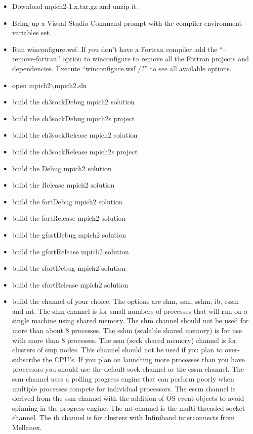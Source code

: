 \documentclass[dvipdfm,11pt]{article}
\begin{document}
\begin{itemize}
\item
Download mpich2-1.x.tar.gz and unzip it.
\item
Bring up a Visual Studio Command prompt with the compiler environment 
variables set.
\item
Run winconfigure.wsf. If you don't have a Fortran compiler add the 
``--remove-fortran'' option to winconfigure to remove all the Fortran 
projects and dependencies.  Execute ``winconfigure.wsf /?'' to see all
available options.
\item 
    open mpich2$\backslash$mpich2.sln
\item
    build the ch3sockDebug mpich2 solution
\item
    build the ch3sockDebug mpich2s project
\item
    build the ch3sockRelease mpich2 solution
\item
    build the ch3sockRelease mpich2s project
\item
    build the Debug mpich2 solution
\item
    build the Release mpich2 solution
\item
    build the fortDebug mpich2 solution
\item
    build the fortRelease mpich2 solution
\item
    build the gfortDebug mpich2 solution
\item
    build the gfortRelease mpich2 solution
\item
    build the sfortDebug mpich2 solution
\item
    build the sfortRelease mpich2 solution
\item
    build the channel of your choice.  The options are shm, ssm, sshm, ib, essm and mt.  
The shm channel is for small numbers of processes that will run on a single 
machine using shared memory.  The shm channel should not be used for more 
than about 8 processes.  The sshm (scalable shared memory) is for use with 
more than 8 processes.  The ssm (sock shared memory) channel is for clusters 
of smp nodes.  This channel should not be used if you plan to over-subscribe 
the CPU's.  If you plan on launching more processes than you have processors 
you should use the default sock channel or the essm channel.  The ssm channel 
uses a polling progress engine that can perform poorly when multiple processes 
compete for individual processors.  The essm channel is derived from the ssm channel
with the addition of OS event objects to avoid spinning in the progress engine.  The mt
channel is the multi-threaded socket channel.  The ib channel is for clusters with Infiniband
interconnects from Mellanox.

\end{itemize}
\end{document}
